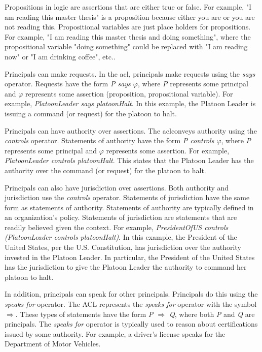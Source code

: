 \documentclass[../../main/main.tex]{subfiles}
\begin{document}
Propositions in logic are assertions that are either true or false.  For example, "I am reading this master thesis" is a proposition because either you are or you are not reading this.  Propositional variables are just place holders for propositions.  For example, "I am reading this master thesis and doing something", where the propositional variable "doing something" could be replaced with "I am reading now" or "I am drinking coffee", etc..

Principals can make requests.  In the \gls{acl}, principals make requests using the \textit{says} operator.  Requests have the form \textit{P says $\varphi$},  where \textit{P} represents some principal and \textit{$\varphi$} represents some assertion (proposition, propositional variable).  For example, \textit{PlatoonLeader says platoonHalt}.  In this example, the Platoon Leader is issuing a command (or request) for the platoon to halt.  

Principals can have authority over assertions.  The \gls{acl}conveys authority using the \textit{controls} operator.  Statements of authority have the form \textit{P controls $\varphi$},  where \textit{P} represents some principal and \textit{$\varphi$} represents some assertion.  For example, \textit{PlatoonLeader controls platoonHalt}.  This states that the Platoon Leader has the authority over the command (or request) for the platoon to halt. 

Principals can also have jurisdiction over assertions.  Both authority and jurisdiction use the \textit{controls} operator.  Statements of jurisdiction have the same form as statements of authority.  Statements of authority are typically defined in an organization's policy.  Statements of jurisdiction are statements that are readily believed given the context.  For example, \textit{PresidentOfUS controls (PlatoonLeader controls platoonHalt)}.  In this example, the President of the United States, per the U.S. Constitution, has jurisdiction over the authority invested in the Platoon Leader.  In particular, the President of the United States has the jurisdiction to give the Platoon Leader the authority to command her platoon to halt.

In addition, principals can speak for other principals.  Principals do this using the \textit{speaks for} operator.  The ACL represents the \textit{speaks for} operator with the symbol $\Rightarrow$.  These types of statements have the form \textit{P $\Rightarrow$ Q}, where both \textit{P} and \textit{Q} are principals.  The \textit{speaks for} operator is typically used to reason about certifications issued by some authority.  For example, a driver's license speaks for the Department of Motor Vehicles.  
\end{document}
